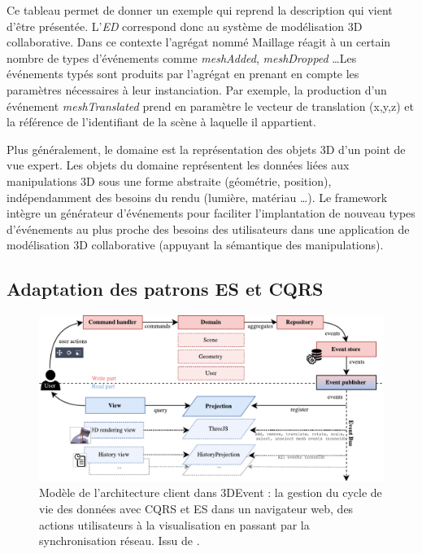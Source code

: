 Ce tableau permet de donner un exemple qui reprend la description qui vient d'être 
présentée. L'\textit{ED} correspond donc au \og système de modélisation 3D 
collaborative\fg{}. Dans ce contexte l'agrégat nommé \og Maillage\fg{} réagit à un 
certain nombre de types d'événements comme \textit{meshAdded}, 
\textit{meshDropped} \dots Les événements typés sont produits par l'agrégat en 
prenant en compte les paramètres nécessaires à leur instanciation. Par exemple, 
la production d'un événement \textit{meshTranslated} prend en paramètre le 
vecteur de translation (x,y,z) et la référence de l'identifiant de la scène à laquelle il 
appartient.


Plus généralement, le domaine est la représentation des objets 3D d'un point de 
vue expert. Les objets du domaine représentent les données liées aux 
manipulations 3D sous une forme abstraite (géométrie, position), indépendamment
des besoins du rendu (lumière, matériau \dots). Le framework intègre un 
générateur d'événements pour faciliter l'implantation de nouveau types 
d'événements au plus proche des besoins des utilisateurs dans une application de 
modélisation 3D collaborative (appuyant la sémantique des manipulations).





\subsection{Adaptation des patrons \gls{ES} et \gls{CQRS}}

\begin{figure}[ht]
	\centering
	\includegraphics[width=\columnwidth]{eps/cqrs2.pdf}
	\caption[Modèle de l'architecture client dans 3DEvent]{Modèle de l'architecture 
		client dans 3DEvent : la gestion du cycle de vie des données avec 
		\gls{CQRS} 
		et \gls{ES} dans un navigateur web, des actions utilisateurs à la visualisation 
		en passant par la synchronisation réseau. Issu de \cite{Desprat2017}.}
	\label{fig:cqrs-client}
\end{figure}


